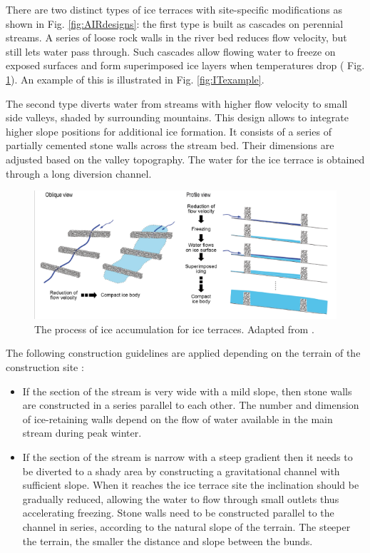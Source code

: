 There are two distinct types of ice terraces with site-specific modifications as shown in Fig.
\ref{fig:AIRdesigns}: the first type is built as cascades on perennial streams. A series of loose rock walls in
the river bed reduces flow velocity, but still lets water pass through. Such cascades allow flowing water to
freeze on exposed surfaces and form superimposed ice layers when temperatures drop ( Fig.
\ref{fig:ITscience}). An example of this is illustrated in Fig. \ref{fig:ITexample}.

The second type diverts water from streams with higher flow velocity to small side valleys, shaded by
surrounding mountains. This design allows to integrate higher slope positions for additional ice formation. It
consists of a series of partially cemented stone walls across the stream bed. Their dimensions are adjusted
based on the valley topography. The water for the ice terrace is obtained through a long diversion channel.

\begin{figure}[htb]
	\centering
	\includegraphics[width=\textwidth]{figs/IT_science.png}

	\caption{ The process of ice accumulation for ice terraces. Adapted from
		\citet{nusserSociohydrologyArtificialGlaciers2019}.}

	\label{fig:ITscience}
\end{figure}

The following construction guidelines are applied depending on the terrain of the construction site
\citep{norphelSnowWaterHarvesting2015}:

\begin{itemize}

	\item If the section of the stream is very wide with a mild slope, then stone walls are
	      constructed in a series parallel to each other. The number and dimension of ice-retaining walls depend on
	      the flow of water available in the main stream during peak winter.

	\item If the section of the stream is narrow with a steep gradient then it needs to be diverted to a shady area
	      by constructing a gravitational channel with sufficient slope. When it reaches the ice terrace site the
	      inclination should be gradually reduced, allowing the water to flow through small outlets thus accelerating freezing. Stone
	      walls need to be constructed parallel to the channel in series, according to the natural slope of the terrain.
	      The steeper the terrain, the smaller the distance and slope between the bunds.

\end{itemize}


